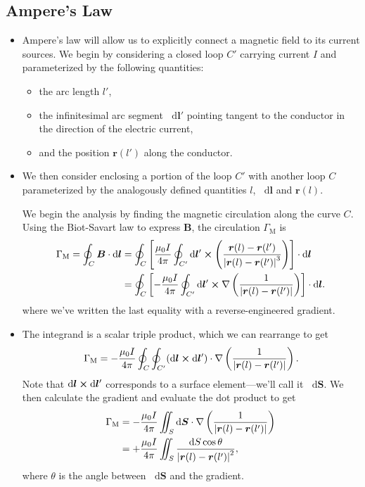 \documentclass[11pt, a4paper]{article}
\newcommand{\diff}{\mathop{}\!\mathrm{d}} %
\renewcommand{\vec}[1]{\bm{#1}} %
\renewcommand{\r}{\vec{r}}
\newcommand{\B}{\vec{B}} %
\newcommand{\mm}{\mu_{0}}  %
\renewcommand{\j}{\vec{j}}  %
\renewcommand{\curl}{\nabla \cross}
\renewcommand{\grad}{\nabla}
\begin{document}
\subsection{Ampere's Law}
\begin{itemize}
	\item Ampere's law will allow us to explicitly connect a magnetic field to its current sources. We begin by considering a closed loop $ C' $ carrying current $ I $ and parameterized by the following quantities:
    \begin{itemize}
        \item the arc length $ l' $,

        \item the infinitesimal arc segment $ \diff \vec{l}' $ pointing tangent to the conductor in the direction of the electric current,

        \item and the position $ \r(l')  $ along the conductor.
    \end{itemize}

	\item We then consider enclosing a portion of the loop $ C' $ with another  loop $ C $ parameterized by the analogously defined quantities $ l $, $ \diff \vec{l} $ and $ \r(l) $.
	
	
	We begin the analysis by finding the magnetic circulation along the curve $ C $. Using the Biot-Savart law to express $ \B $, the circulation $ \Gamma_{\text{M}} $ is
	\begin{align*}
        \Gamma_{\text{M}} = \oint_{C} \B \cdot \diff \vec{l} & = \oint_{C}\left[\frac{\mm I}{4 \pi} \oint_{C'}\diff \vec{l}' \cross \left(\frac{\r(l) - \r(l')}{\abs{\r(l) - \r(l')}^{3}}\right) \right] \cdot \diff \vec{l}\\
        & = \oint_{C}\left[ - \frac{\mm I}{4 \pi} \oint_{C'}\diff \vec{l}' \cross \grad \left(\frac{1}{\abs{\r(l) - \r(l')}}\right) \right] \cdot \diff \vec{l}.
	\end{align*}
	where we've written the last equality with a reverse-engineered gradient. 

    \item The integrand is a scalar triple product, which we can rearrange to get
	\begin{equation*}
		\Gamma_{\text{M}} =  - \frac{\mm I}{4\pi} \oint_{C} \oint_{C'} (\diff \vec{l} \cross \diff \vec{l}') \cdot \grad \left(\frac{1}{\abs{\r(l) - \r(l')}}\right).
	\end{equation*}
	Note that $ \diff \vec{l} \cross \diff \vec{l}' $ corresponds to a surface element---we'll call it $ \diff \vec{S} $. We then calculate the gradient and evaluate the dot product to get
	\begin{align*}
        \Gamma_{\text{M}} & =  - \frac{\mm I}{4\pi} \iint_{S} \diff \vec{S}\cdot \grad \left(\frac{1}{\abs{\r(l) - \r(l')}}\right) \\
        & = +  \frac{\mm I}{4\pi} \iint_{S}  \frac{\diff S \cos \theta}{\abs{\r(l) - \r(l')}^{2}},
	\end{align*}
	where $ \theta $ is the angle between $ \diff \vec{S} $ and the gradient. 


\end{itemize}
\end{document}
